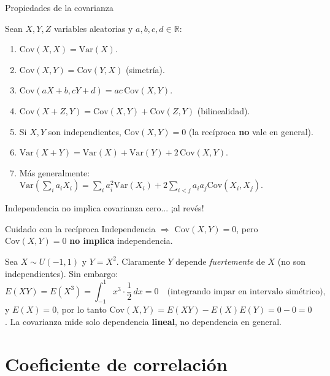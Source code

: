 \documentclass[aspectratio=169,11pt]{beamer}
\begin{document}
\begin{frame}{Propiedades de la covarianza}
\begin{theorem}[Propiedades]
Sean $X,Y,Z$ variables aleatorias y $a,b,c,d \in \mathbb{R}$:
\begin{enumerate}
\item $\text{Cov}(X,X) = \text{Var}(X)$.
\item $\text{Cov}(X,Y) = \text{Cov}(Y,X)$ (simetría).
\item $\text{Cov}(aX+b, cY+d) = ac\,\text{Cov}(X,Y)$.
\item $\text{Cov}(X+Z, Y) = \text{Cov}(X,Y) + \text{Cov}(Z,Y)$ (bilinealidad).
\item Si $X, Y$ son independientes, $\text{Cov}(X,Y) = 0$ (la recíproca \textbf{no} vale en general).
\item $\text{Var}(X+Y) = \text{Var}(X) + \text{Var}(Y) + 2\,\text{Cov}(X,Y)$.
\item Más generalmente: $\text{Var}\left(\sum_i a_i X_i\right) = \sum_i a_i^2 \text{Var}(X_i) + 2\sum_{i<j} a_i a_j \text{Cov}(X_i,X_j)$.
\end{enumerate}
\end{theorem}
\end{frame}

\begin{frame}{Independencia no implica covarianza cero... ¡al revés!}
\begin{alertblock}{Cuidado con la recíproca}
Independencia $\Rightarrow$ $\text{Cov}(X,Y)=0$, pero $\text{Cov}(X,Y)=0$ \textbf{no implica} independencia.
\end{alertblock}

\begin{example}
Sea $X \sim U(-1,1)$ y $Y = X^2$. Claramente $Y$ depende \emph{fuertemente} de $X$ (no son independientes). Sin embargo:
\[
E(XY) = E(X^3) = \int_{-1}^1 x^3 \cdot \frac12\, dx = 0 \quad \text{(integrando impar en intervalo simétrico)},
\]
y $E(X) = 0$, por lo tanto $\text{Cov}(X,Y) = E(XY) - E(X)E(Y) = 0 - 0 = 0$. La covarianza mide solo dependencia \textbf{lineal}, no dependencia en general.
\end{example}
\end{frame}

\section{Coeficiente de correlación}
\end{document}
